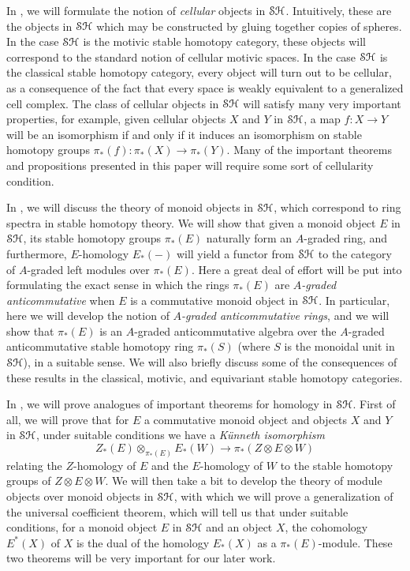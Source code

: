 \documentclass[../main.tex]{subfiles}
\begin{document}
In , we will formulate the notion of \emph{cellular} objects in $\mathcal{SH}$. Intuitively, these are the objects in $\mathcal{SH}$ which may be constructed by gluing together copies of spheres. In the case $\mathcal{SH}$ is the motivic stable homotopy category, these objects will correspond to the standard notion of cellular motivic spaces. In the case $\mathcal{SH}$ is the classical stable homotopy category, every object will turn out to be cellular, as a consequence of the fact that every space is weakly equivalent to a generalized cell complex. The class of cellular objects in $\mathcal{SH}$ will satisfy many very important properties, for example, given cellular objects $X$ and $Y$ in $\mathcal{SH}$, a map $f:X\to Y$ will be an isomorphism if and only if it induces an isomorphism on stable homotopy groups $\pi_*(f):\pi_*(X)\to\pi_*(Y)$. Many of the important theorems and propositions presented in this paper will require some sort of cellularity condition.

In , we will discuss the theory of monoid objects in $\mathcal{SH}$, which correspond to ring spectra in stable homotopy theory. We will show that given a monoid object $E$ in $\mathcal{SH}$, its stable homotopy groups $\pi_*(E)$ naturally form an $A$-graded ring, and furthermore, $E$-homology $E_*(-)$ will yield a functor from $\mathcal{SH}$ to the category of $A$-graded left modules over $\pi_*(E)$. Here a great deal of effort will be put into formulating the exact sense in which the rings $\pi_*(E)$ are \emph{$A$-graded anticommutative} when $E$ is a commutative monoid object in $\mathcal{SH}$. In particular, here we will develop the notion of \emph{$A$-graded anticommutative rings}, and we will show that $\pi_*(E)$ is an $A$-graded anticommutative algebra over the $A$-graded anticommutative stable homotopy ring $\pi_*(S)$ (where $S$ is the monoidal unit in $\mathcal{SH}$), in a suitable sense. We will also briefly discuss some of the consequences of these results in the classical, motivic, and equivariant stable homotopy categories.

In , we will prove analogues of important theorems for homology in $\mathcal{SH}$. First of all, we will prove that for $E$ a commutative monoid object and objects $X$ and $Y$ in $\mathcal{SH}$, under suitable conditions we have a \emph{K\"unneth isomorphism}
\[Z_*(E)\otimes_{\pi_*(E)}E_*(W)\to\pi_*(Z\otimes E\otimes W)\]
relating the $Z$-homology of $E$ and the $E$-homology of $W$ to the stable homotopy groups of $Z\otimes E\otimes W$. We will then take a bit to develop the theory of module objects over monoid objects in $\mathcal{SH}$, with which we will prove a generalization of the universal coefficient theorem, which will tell us that under suitable conditions, for a monoid object $E$ in $\mathcal{SH}$ and an object $X$, the cohomology $E^*(X)$ of $X$ is the dual of the homology $E_*(X)$ as a $\pi_*(E)$-module. These two theorems will be very important for our later work.
\end{document}
